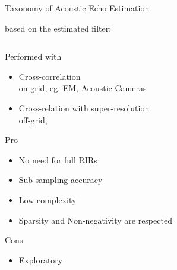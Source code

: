 \begin{frame}{Taxonomy of Acoustic Echo Estimation}
\begin{block}{\mytriag based on the estimated filter:}
\begin{columns}[T,onlytextwidth]
\begin{column}{.48\textwidth}
\begin{enumerate}
                \end{enumerate}
                Performed with
                \begin{itemize}
                    \item Cross-correlation
                    \\on-grid, eg. EM, Acoustic Cameras
                    \item Cross-relation with super-resolution
                    \\off-grid,~\cite{mulan,blaster}
                \end{itemize}
                Pro
                \begin{itemize}
                    \item No need for full RIRs
                    \item Sub-sampling accuracy
                    \item Low complexity
                    \item Sparsity and Non-negativity are respected
                \end{itemize}
                Cons
                \begin{itemize}
                    \item Exploratory
                \end{itemize}
            \end{column}%
        \end{columns}

    \end{block}



\end{frame}

